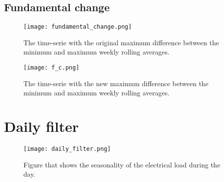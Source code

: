 \subsection{Fundamental change}

\begin{figure}[h!]
	\centering
	\texttt{[image: fundamental\_change.png]}
	\caption{The time-serie with the original maximum difference between the minimum and maximum weekly rolling averages.}
	\label{fig:fundamental_change}
\end{figure}

\begin{figure}[h!]
	\centering
	\texttt{[image: f\_c.png]}
	\caption{The time-serie with the new maximum difference between the minimum and maximum weekly rolling averages.}
	\label{fig:f_c}
\end{figure}


\section{Daily filter}
\begin{figure}[h!]
	\centering
	\texttt{[image: daily\_filter.png]}
	\caption{Figure that shows the seasonality of the electrical load during the day.}
	\label{fig:daily_filter}
\end{figure}



